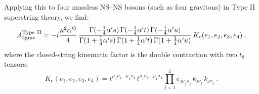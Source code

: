 \noindent Applying this to four massless NS--NS bosons (such as four gravitons) in Type II superstring theory, we find:
\begin{equation}
	\mathcal{A}_{4\mathrm{grav}}^{\mathrm{Type\ II}} = -i\frac{\kappa^{2}\alpha'^{3}}{4}\,\frac{\Gamma(-\frac{1}{4}\alpha's)\,\Gamma(-\frac{1}{4}\alpha't)\,\Gamma(-\frac{1}{4}\alpha'u)}{\Gamma(1+\frac{1}{4}\alpha's)\,\Gamma(1+\frac{1}{4}\alpha't)\,\Gamma(1+\frac{1}{4}\alpha'u)}\,K_{\mathrm{c}}(e_{1},e_{2},e_{3},e_{4}) \:, \label{12.4.30}
\end{equation}
where the closed-string kinematic factor is the double contraction with two $t_{8}$ tensors:
\begin{equation}
	K_{\mathrm{c}}(e_{1},e_{2},e_{3},e_{4}) = t^{\mu_{1}\nu_{1}\dots\mu_{4}\nu_{4}}\,t^{\rho_{1}\sigma_{1}\dots\rho_{4}\sigma_{4}}\prod_{j=1}^{4}e_{j\mu_{j}\rho_{j}}\,k_{j\nu_{j}}\,k_{j\sigma_{j}} \:. \label{12.4.31}
\end{equation}

